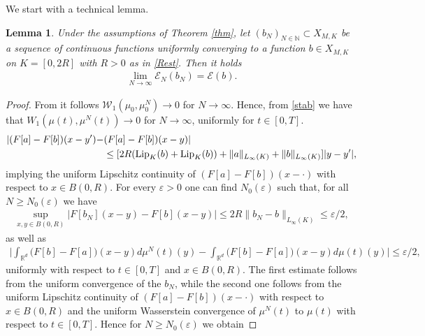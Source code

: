 \documentclass[A4paper,11pt]{article}
\newtheorem{lemma}[theorem]{Lemma}
\theoremstyle{definition}
\newcommand{\Lip}{\textup{Lip}}
\newcommand{\N}{\mathbb{N}}
\newcommand{\R}{\mathbb{R}}
\newcommand{\W}{\mathcal{W}}
\DeclareMathOperator{\supp}{supp}
\begin{document}
We start with a technical lemma.

\begin{lemma}\label{lemma-semicontinuous-1}
	Under the assumptions of Theorem \ref{thm}, let $(b_N)_{N \in \N}\subset X_{M,K}$ be a sequence of continuous functions uniformly converging to a function $b \in X_{M,K}$ on $K=[0,2R]$  with $R>0$ as in \eqref{Rest}. %
Then it holds
	\begin{align*}
		\lim_{N\rightarrow\infty} \mathcal E_{N}(b_{N})= \mathcal E(b).
	\end{align*}
\end{lemma}

\begin{proof}
	From \cite[Lemma 3.3]{fornahuetter} it follows $\W_1(\mu_0,\mu^N_0) \rightarrow 0$ for $N \rightarrow \infty$. Hence, from \eqref{stab} we have that $W_1(\mu(t),\mu^N(t))\rightarrow 0$ for $N\rightarrow\infty$, uniformly for  $t \in [0,T]$.%
\begin{align*}
|(F[a] -F[ b])(x-y') - &(F[a] -F[ b])(x- y)|  \\
& \leq [2R (\Lip_K( b) + \Lip_K( b))    +\|a\|_{L_\infty(K)} + \| b\|_{L_\infty(K)} ] |y-y'|,
\end{align*}
implying the uniform Lipschitz continuity of $(F[a] -F[ b])(x- \cdot)$ with respect to $x \in B(0,R)$.
For every $\varepsilon > 0$ one can find $N_0(\varepsilon)$ such that, for all $N \geq N_0(\varepsilon)$ we have
	\begin{align*}
		\sup_{x,y \in B(0,R)}|F[ b_{N}](x-y)-F[ b](x-y)|
			\leq 2R \| b_{N}- b\|_{L_\infty(K)}\leq\varepsilon/2,
	\end{align*}
	as well as
	\begin{align*}
		\biggl|\int_{\R^d}\bigl(F[ b]-F[a]\bigr)(x-y)d\mu^{N}(t)(y)
			-\int_{\R^d}\bigl(F[ b]-F[a]\bigr)(x-y)d\mu(t)(y)\biggr|\leq\varepsilon/2,
	\end{align*}
uniformly with respect to $t \in [0,T]$ and $x \in B(0,R)$.
	The first estimate follows from  the uniform convergence of the $ b_{N}$, while the second one follows from the uniform Lipschitz continuity of
	$(F[a] -F[ b])(x- \cdot)$ with respect to $x \in B(0,R)$  and the uniform Wasserstein convergence of $\mu^{N}(t)$ to $\mu(t)$ with respect to $t \in [0,T]$. Hence for $N\geq N_0(\varepsilon)$ we obtain

\end{proof}
\end{document}
